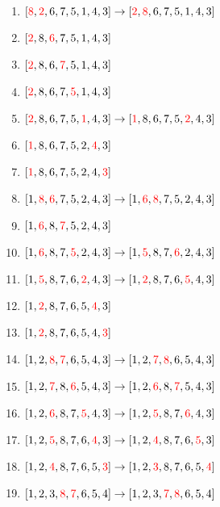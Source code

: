 \documentclass[draft]{article}
\begin{document}
\begin{solution}
    \begin{enumerate}[nosep]
        \item $[{\color{red}8},{\color{red}2},6,7,5,1,4,3]\rightarrow [{\color{red}2},{\color{red}8},6,7,5,1,4,3]$
        \item $[{\color{red}2},8,{\color{red}6},7,5,1,4,3]$
        \item $[{\color{red}2},8,6,{\color{red}7},5,1,4,3]$
        \item $[{\color{red}2},8,6,7,{\color{red}5},1,4,3]$
        \item $[{\color{red}2},8,6,7,5,{\color{red}1},4,3]\rightarrow [{\color{red}1},8,6,7,5,{\color{red}2},4,3]$
        \item $[{\color{red}1},8,6,7,5,2,{\color{red}4},3]$
        \item $[{\color{red}1},8,6,7,5,2,4,{\color{red}3}]$
        \item $[1,{\color{red}8},{\color{red}6},7,5,2,4,3]\rightarrow [1,{\color{red}6},{\color{red}8},7,5,2,4,3]$
        \item $[1,{\color{red}6},8,{\color{red}7},5,2,4,3]$
        \item $[1,{\color{red}6},8,7,{\color{red}5},2,4,3]\rightarrow [1,{\color{red}5},8,7,{\color{red}6},2,4,3]$
        \item $[1,{\color{red}5},8,7,6,{\color{red}2},4,3]\rightarrow [1,{\color{red}2},8,7,6,{\color{red}5},4,3]$
        \item $[1,{\color{red}2},8,7,6,5,{\color{red}4},3]$
        \item $[1,{\color{red}2},8,7,6,5,4,{\color{red}3}]$
        \item $[1,2,{\color{red}8},{\color{red}7},6,5,4,3]\rightarrow [1,2,{\color{red}7},{\color{red}8},6,5,4,3]$
        \item $[1,2,{\color{red}7},8,{\color{red}6},5,4,3]\rightarrow [1,2,{\color{red}6},8,{\color{red}7},5,4,3]$
        \item $[1,2,{\color{red}6},8,7,{\color{red}5},4,3]\rightarrow [1,2,{\color{red}5},8,7,{\color{red}6},4,3]$
        \item $[1,2,{\color{red}5},8,7,6,{\color{red}4},3]\rightarrow [1,2,{\color{red}4},8,7,6,{\color{red}5},3]$
        \item $[1,2,{\color{red}4},8,7,6,5,{\color{red}3}]\rightarrow [1,2,{\color{red}3},8,7,6,5,{\color{red}4}]$
        \item $[1,2,3,{\color{red}8},{\color{red}7},6,5,4]\rightarrow [1,2,3,{\color{red}7},{\color{red}8},6,5,4]$

\end{enumerate}
\end{solution}
\end{document}
